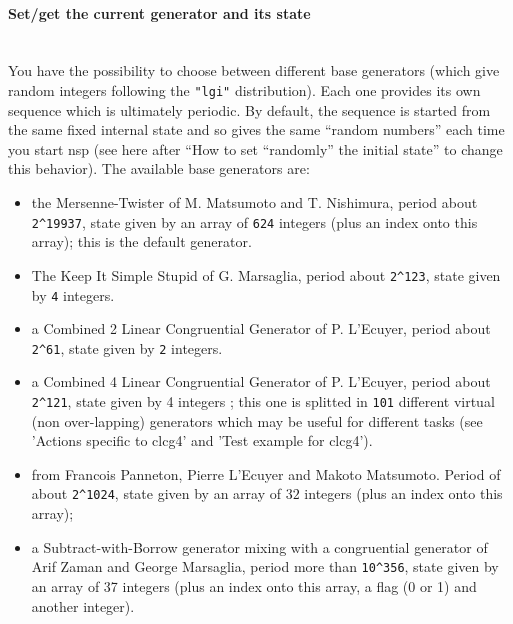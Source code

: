 \paragraph{Set/get the current generator and its state}
~~\\

You have the possibility to choose between different base 
generators (which give random integers following the \verb!"lgi"!
distribution). Each one provides its own sequence which is ultimately 
periodic. By default, the sequence is started from the same fixed 
internal state and so gives the same ``random numbers'' each time you 
start nsp (see here after ``How to set ``randomly'' the initial state'' 
to change this behavior). The available base generators are:
\begin{itemize}
\item {}  the Mersenne-Twister of M. Matsumoto and T. Nishimura, period about \verb!2^19937!, 
  state given by an array of \verb!624! integers (plus an index onto this array); this  
  is the default generator.
\item {}  The Keep It Simple Stupid of G. Marsaglia,  period about \verb!2^123!,
  state given by \verb!4! integers.
\item {}  a Combined 2 Linear Congruential Generator of P. L'Ecuyer,
  period about \verb!2^61!, state given by \verb!2! integers.
\item {}  a Combined 4 Linear Congruential Generator of P. L'Ecuyer,
  period about \verb!2^121!, state given by 4 integers ; this one is 
  splitted in \verb!101! different virtual (non over-lapping) generators 
  which may be useful for different tasks (see 'Actions specific to clcg4' and
  'Test example for clcg4').
\item {} from Francois Panneton, Pierre L'Ecuyer and
  Makoto Matsumoto. Period of about \verb!2^1024!, state given by an array of $32$
  integers (plus an index onto this array);
\item {} a Subtract-with-Borrow generator mixing with a congruential
  generator of Arif Zaman and George Marsaglia, period more than \verb!10^356!,
  state given by an array of 37 integers (plus an index onto this array, a flag (0 or 1)
  and another integer). 
\end{itemize}

